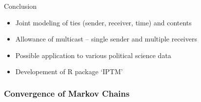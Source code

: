 \documentclass[10pt]{beamer}
\def\bni{\begin{itemize}} \def\ei{\end{itemize}}
\theoremstyle{definition}
\theoremstyle{remark}
\begin{document}
\begin{frame}{Conclusion}
 \bni
 \item Joint modeling of ties (sender, receiver, time) and contents
 	\vspace{0.4cm}
 \item Allowance of multicast -- single sender and multiple receivers
 	\vspace{0.4cm}
 \item Possible application to various political science data
 	\vspace{0.4cm}
 	\item Developement of R package `IPTM'
 \ei
\end{frame}



\begin{frame} \frametitle{Convergence of Markov Chains}



\end{frame}
\end{document}
